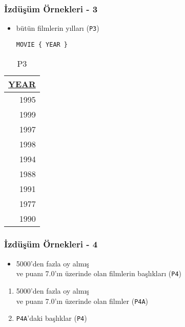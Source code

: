 \documentclass[dvipsnames]{beamer}
\theoremstyle{plain}
\begin{document}
\begin{frame}[fragile]
  \frametitle{İzdüşüm Örnekleri - 3}

    \begin{itemize}
      \item bütün filmlerin yılları (\texttt{P3})
    \begin{lstlisting}
MOVIE { YEAR }
    \end{lstlisting}
    \end{itemize}

    \vspace{-10pt}
    \begin{tiny}
    \begin{table}
      \caption{P3}
      \begin{tabular}{|r|}\hline
\underline{YEAR}\\[2pt]\hline\hline
            1995\\\hline
            1999\\\hline
            1997\\\hline
            1998\\\hline
            1994\\\hline
            1988\\\hline
            1991\\\hline
            1977\\\hline
            1990\\\hline
      \end{tabular}
    \end{table}
    \end{tiny}
\end{frame}

\begin{frame}
  \frametitle{İzdüşüm Örnekleri - 4}

    \begin{itemize}
      \item 5000'den fazla oy almış\\
      ve puanı 7.0'ın üzerinde olan filmlerin başlıkları (\texttt{P4})
    \end{itemize}

    \pause
    \begin{enumerate}
      \item 5000'den fazla oy almış\\
      ve puanı 7.0'ın üzerinde olan filmler (\texttt{P4A})
      \item \texttt{P4A}'daki başlıklar (\texttt{P4})
    \end{enumerate}
\end{frame}
\end{document}
